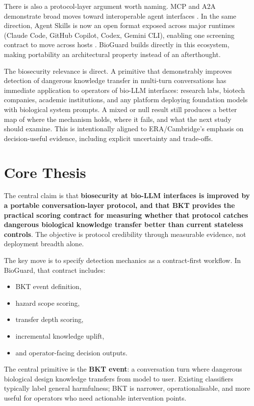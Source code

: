 \documentclass[10.5pt,a4paper]{article}
\begin{document}
There is also a protocol-layer argument worth naming. MCP and A2A demonstrate broad moves toward interoperable agent interfaces \cite{mcp2026,a2a2025}. In the same direction, Agent Skills is now an open format exposed across major runtimes (Claude Code, GitHub Copilot, Codex, Gemini CLI), enabling one screening contract to move across hosts \cite{agentskills2026,claude2026,githubclispec,copilot2026}. BioGuard builds directly in this ecosystem, making portability an architectural property instead of an afterthought.

The biosecurity relevance is direct. A primitive that demonstrably improves detection of dangerous knowledge transfer in multi-turn conversations has immediate application to operators of bio-LLM interfaces: research labs, biotech companies, academic institutions, and any platform deploying foundation models with biological system prompts. A mixed or null result still produces a better map of where the mechanism holds, where it fails, and what the next study should examine. This is intentionally aligned to ERA/Cambridge's emphasis on decision-useful evidence, including explicit uncertainty and trade-offs.

\section*{Core Thesis}

The central claim is that \textbf{biosecurity at bio-LLM interfaces is improved by a portable conversation-layer protocol, and that BKT provides the practical scoring contract for measuring whether that protocol catches dangerous biological knowledge transfer better than current stateless controls}. The objective is protocol credibility through measurable evidence, not deployment breadth alone.

The key move is to specify detection mechanics as a contract-first workflow. In BioGuard, that contract includes:
\begin{itemize}[leftmargin=1.2em]
  \item BKT event definition,
  \item hazard scope scoring,
  \item transfer depth scoring,
  \item incremental knowledge uplift,
  \item and operator-facing decision outputs.
\end{itemize}

The central primitive is the \textbf{BKT event}: a conversation turn where dangerous biological design knowledge transfers from model to user. Existing classifiers typically label general harmfulness; BKT is narrower, operationalisable, and more useful for operators who need actionable intervention points.
\end{document}
